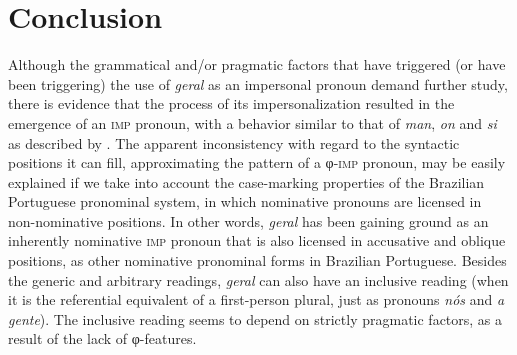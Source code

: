 \documentclass[output=paper]{langscibook}
\begin{document}
\section{Conclusion}\label{sec:avelar:7}

Although the grammatical and/or pragmatic factors that have triggered (or have been triggering) the use of \textit{geral} as an impersonal pronoun demand further study, there is evidence that the process of its impersonalization resulted in the emergence of an \textsc{imp} pronoun, with a behavior similar to that of {\textit{man}}, {\textit{on}} {and} {\textit{si}} as described by \citet{Egerland2003}. The apparent inconsistency with regard to the syntactic positions it can fill, approximating the pattern of a φ-\textsc{imp} pronoun, may be easily explained if we take into account the case-marking properties of the Brazilian Portuguese pronominal system, in which nominative pronouns are licensed in non-nominative positions. In other words, \textit{geral} has been gaining ground as an inherently nominative \textsc{imp} pronoun that is also licensed in accusative and oblique positions, as other nominative pronominal forms in Brazilian Portuguese. Besides the generic and arbitrary readings, \textit{geral} can also have an inclusive reading (when it is the referential equivalent of a first-person plural, just as pronouns \textit{nós} {and} {\textit{a gente}}). The inclusive reading seems to depend on strictly pragmatic factors, as a result of the lack of φ-fea\-tures.\largerpage

\label{appendix:avelar}
\end{document}
